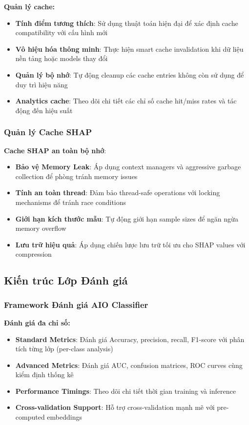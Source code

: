 \textbf{Quản lý cache:}
\begin{itemize}
    \item \textbf{Tính điểm tương thích}: Sử dụng thuật toán hiện đại để xác định cache compatibility với cấu hình mới
    \item \textbf{Vô hiệu hóa thông minh}: Thực hiện smart cache invalidation khi dữ liệu nền tảng hoặc models thay đổi
    \item \textbf{Quản lý bộ nhớ}: Tự động cleanup các cache entries không còn sử dụng để duy trì hiệu năng
    \item \textbf{Analytics cache}: Theo dõi chi tiết các chỉ số cache hit/miss rates và tác động đến hiệu suất
\end{itemize}

\subsubsection{Quản lý Cache SHAP}

\textbf{Cache SHAP an toàn bộ nhớ}:
\begin{itemize}
    \item \textbf{Bảo vệ Memory Leak}: Áp dụng context managers và aggressive garbage collection để phòng tránh memory issues
    \item \textbf{Tính an toàn thread}: Đảm bảo thread-safe operations với locking mechanisms để tránh race conditions
    \item \textbf{Giới hạn kích thước mẫu}: Tự động giới hạn sample sizes để ngăn ngừa memory overflow
    \item \textbf{Lưu trữ hiệu quả}: Áp dụng chiến lược lưu trữ tối ưu cho SHAP values với compression
\end{itemize}

\subsection{Kiến trúc Lớp Đánh giá}\label{subsec:evaluation-architecture}

\subsubsection{Framework Đánh giá AIO Classifier}\label{subsec:evaluation-framework}

\textbf{Đánh giá đa chỉ số:}
\begin{itemize}
    \item \textbf{Standard Metrics}: Đánh giá Accuracy, precision, recall, F1-score với phân tích từng lớp (per-class analysis)
    \item \textbf{Advanced Metrics}: Đánh giá AUC, confusion matrices, ROC curves cùng kiểm định thống kê
    \item \textbf{Performance Timings}: Theo dõi chi tiết thời gian training và inference
    \item \textbf{Cross-validation Support}: Hỗ trợ cross-validation mạnh mẽ với pre-computed embeddings
\end{itemize}

